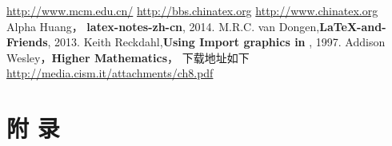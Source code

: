 \documentclass[nocover]{cumcmart}%
\begin{document}
%
%
%
%
%
%
%



\begin{thebibliography}{10}
 \url{http://www.mcm.edu.cn/}
 \url{http://bbs.chinatex.org}
 \url{http://www.chinatex.org}
 Alpha Huang， \textbf{latex-notes-zh-cn}, 2014.
M.R.C. van Dongen,\textbf{\LaTeX-and-Friends}, 2013.
Keith Reckdahl,\textbf{Using Import graphics in \LaTeXe}, 1997.
Addison Wesley，\textbf{Higher Mathematics}， 下载地址如下\\ \url{http://media.cism.it/attachments/ch8.pdf}
\end{thebibliography}


\newpage
\appendix
\section*{附 \quad 录}
\end{document}
